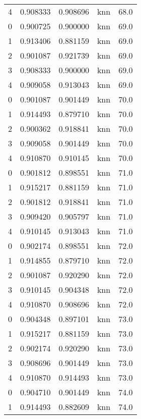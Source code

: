 \begin{tabular}{rrrlr}
     4 & 0.908333 & 0.908696 &      knn &       68.0 \\
     0 & 0.900725 & 0.900000 &      knn &       69.0 \\
     1 & 0.913406 & 0.881159 &      knn &       69.0 \\
     2 & 0.901087 & 0.921739 &      knn &       69.0 \\
     3 & 0.908333 & 0.900000 &      knn &       69.0 \\
     4 & 0.909058 & 0.913043 &      knn &       69.0 \\
     0 & 0.901087 & 0.901449 &      knn &       70.0 \\
     1 & 0.914493 & 0.879710 &      knn &       70.0 \\
     2 & 0.900362 & 0.918841 &      knn &       70.0 \\
     3 & 0.909058 & 0.901449 &      knn &       70.0 \\
     4 & 0.910870 & 0.910145 &      knn &       70.0 \\
     0 & 0.901812 & 0.898551 &      knn &       71.0 \\
     1 & 0.915217 & 0.881159 &      knn &       71.0 \\
     2 & 0.901812 & 0.918841 &      knn &       71.0 \\
     3 & 0.909420 & 0.905797 &      knn &       71.0 \\
     4 & 0.910145 & 0.913043 &      knn &       71.0 \\
     0 & 0.902174 & 0.898551 &      knn &       72.0 \\
     1 & 0.914855 & 0.879710 &      knn &       72.0 \\
     2 & 0.901087 & 0.920290 &      knn &       72.0 \\
     3 & 0.910145 & 0.904348 &      knn &       72.0 \\
     4 & 0.910870 & 0.908696 &      knn &       72.0 \\
     0 & 0.904348 & 0.897101 &      knn &       73.0 \\
     1 & 0.915217 & 0.881159 &      knn &       73.0 \\
     2 & 0.902174 & 0.920290 &      knn &       73.0 \\
     3 & 0.908696 & 0.901449 &      knn &       73.0 \\
     4 & 0.910870 & 0.914493 &      knn &       73.0 \\
     0 & 0.904710 & 0.901449 &      knn &       74.0 \\
     1 & 0.914493 & 0.882609 &      knn &       74.0 \\

\end{tabular}
